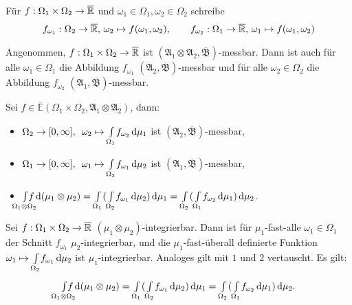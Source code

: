 \documentclass{cheat-sheet}
\newcommand{\Alg}{\mathfrak{A}} %
\newcommand{\Bor}{\mathfrak{B}} %
\newcommand{\E}{\mathbb{E}} %
\begin{document}
\begin{nota}
  Für $f : \Omega_1 \times \Omega_2 \to \overline{\mathbb{R}}$ und $\omega_1 \in \Omega_1, \omega_2 \in \Omega_2$ schreibe
  \begin{align*}
    f_{\omega_1} : \Omega_2 \to \overline{\mathbb{R}}, \, \omega_2 \mapsto f(\omega_1, \omega_2), \qquad
    f_{\omega_2} : \Omega_1 \to \overline{\mathbb{R}}, \, \omega_1 \mapsto f(\omega_1, \omega_2)
  \end{align*}
\end{nota}

\begin{lem}
  Angenommen, $f : \Omega_1 \times \Omega_2 \to \overline{\mathbb{R}}$ ist $(\Alg_1 \otimes \Alg_2, \overline{\Bor})$-messbar. Dann ist auch für alle $\omega_1 \in \Omega_1$ die Abbildung $f_{\omega_1}$ $(\Alg_2, \overline{\Bor})$-messbar und für alle $\omega_2 \in \Omega_2$ die Abbildung $f_{\omega_2}$ $(\Alg_1, \overline{\Bor})$-messbar.
\end{lem}

\begin{satz}[Tonelli]
  Sei $f \in \overline{\E}(\Omega_1 \times \Omega_2, \Alg_1 \otimes \Alg_2)$, dann:
  \begin{itemize}
    \item $\Omega_2 \to [0, \infty], \enspace \omega_2 \mapsto {\textstyle \int\limits_{\Omega_1}^{}} f_{\omega_2} \,\mathrm{d} \mu_1$ \enspace ist $(\Alg_2, \overline{\Bor})$-messbar,
    \item $\Omega_1 \to [0, \infty], \enspace \omega_1 \mapsto {\textstyle \int\limits_{\Omega_2}^{}} f_{\omega_1} \,\mathrm{d} \mu_2$ \enspace ist $(\Alg_1, \overline{\Bor})$-messbar,
    \item \quad $\Int{\mathclap{\Omega_1 \otimes \Omega_2}}{}{f}{(\mu_1 \otimes \mu_2)} = \Int{\Omega_1}{}{(\Int{\Omega_2}{}{f_{\omega_1}}{\mu_2})}{\mu_1} = \Int{\Omega_2}{}{(\Int{\Omega_1}{}{f_{\omega_2}}{\mu_1})}{\mu_2}$.
  \end{itemize}
\end{satz}

\begin{satz}[Fubini]
  Sei $f : \Omega_1 \times \Omega_2 \to \overline{\mathbb{R}}$ $(\mu_1 \otimes \mu_2)$-integrierbar. Dann ist für $\mu_1$-fast-alle $\omega_1 \in \Omega_1$ der Schnitt $f_{\omega_1}$ $\mu_2$-integrierbar, und die $\mu_1$-fast-überall definierte Funktion $\omega_1 \mapsto {\textstyle \int\limits_{\Omega_2}^{}} f_{\omega_1} \,\mathrm{d} \mu_2$ ist $\mu_1$-integrierbar. Analoges gilt mit $1$ und $2$ vertauscht. Es gilt:
  \[ \Int{\mathclap{\Omega_1 \otimes \Omega_2}}{}{f}{(\mu_1 \otimes \mu_2)} = \Int{\Omega_1}{}{(\Int{\Omega_2}{}{f_{\omega_1}}{\mu_2})}{\mu_1} = \Int{\Omega_2}{}{(\Int{\Omega_1}{}{f_{\omega_2}}{\mu_1})}{\mu_2}. \]
\end{satz}
\end{document}

